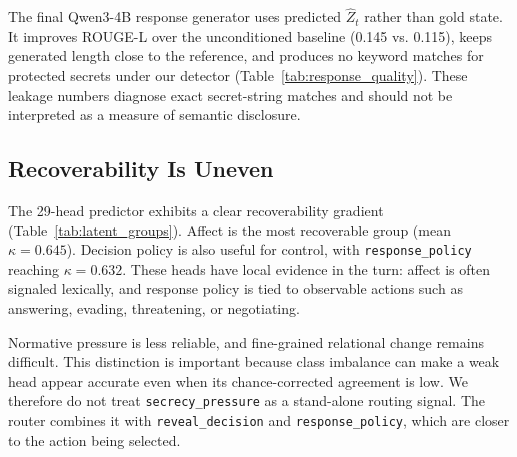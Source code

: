 \documentclass[11pt]{article}
\begin{document}
The final Qwen3-4B response generator uses predicted $\hat{Z}_t$ rather than gold state. It improves ROUGE-L over the unconditioned baseline (0.145 vs. 0.115), keeps generated length close to the reference, and produces no keyword matches for protected secrets under our detector (Table~\ref{tab:response_quality}). These leakage numbers diagnose exact secret-string matches and should not be interpreted as a measure of semantic disclosure.

\begin{table}[t]
\centering
\caption{Response quality with predicted $\hat{Z}_t$ on 683 validation turns. Single-seed evaluation on the best validation checkpoint.}
\label{tab:response_quality}
\small
{}
\end{table}

\subsection{Recoverability Is Uneven}
\label{sec:recoverability}

The 29-head predictor exhibits a clear recoverability gradient (Table~\ref{tab:latent_groups}). Affect is the most recoverable group (mean $\kappa=0.645$). Decision policy is also useful for control, with \texttt{response\_policy} reaching $\kappa=0.632$. These heads have local evidence in the turn: affect is often signaled lexically, and response policy is tied to observable actions such as answering, evading, threatening, or negotiating.

Normative pressure is less reliable, and fine-grained relational change remains difficult. This distinction is important because class imbalance can make a weak head appear accurate even when its chance-corrected agreement is low. We therefore do not treat \texttt{secrecy\_pressure} as a stand-alone routing signal. The router combines it with \texttt{reveal\_decision} and \texttt{response\_policy}, which are closer to the action being selected.
\end{document}
